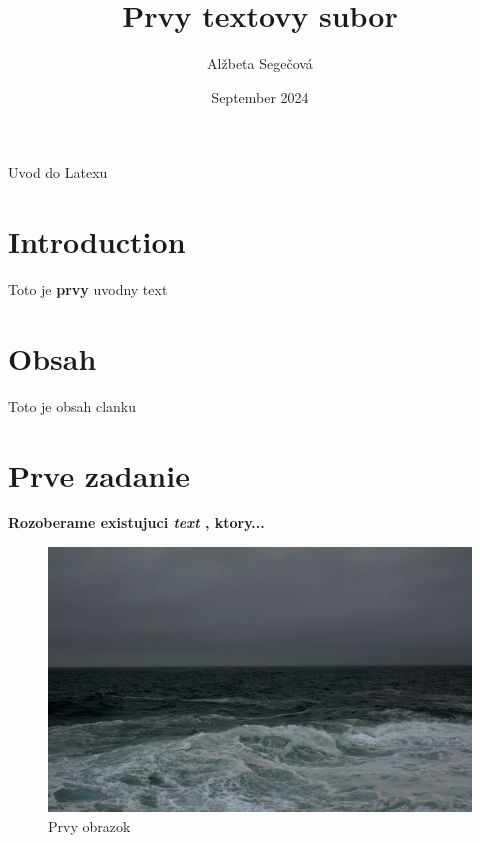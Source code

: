 \documentclass[10pt,letterpaper]{article}
\title{Prvy textovy subor}
\author{Alžbeta Segečová}
\date{September 2024}
\begin{document}
\maketitle
Uvod do Latexu

\section{Introduction}
Toto je \textbf{prvy} uvodny text 

\section{Obsah}
Toto je obsah clanku

\section{Prve zadanie}
\textbf{Rozoberame existujuci \emph{text} , ktory... }

\begin{figure}
    \centering
    \includegraphics[width=0.5\linewidth]{o.jpg}
    \caption{Prvy obrazok}
    \label{fig:enter-label}
\end{figure}
\end{document}
